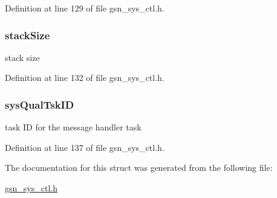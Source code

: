 Definition at line 129 of file gsn\_\-sys\_\-ctl.h.

\hypertarget{a00249_a82cabdcaee43fc729a1da5551d429f73}{
\subsubsection[{stackSize}]{ {\bf stackSize}}}
\label{a00249_a82cabdcaee43fc729a1da5551d429f73}
stack size 

Definition at line 132 of file gsn\_\-sys\_\-ctl.h.

\hypertarget{a00249_a3e06cb8fa58f49b7004a85c6f387ddc7}{
\subsubsection[{sysQualTskID}]{ {\bf sysQualTskID}}}
\label{a00249_a3e06cb8fa58f49b7004a85c6f387ddc7}
task ID for the message handler task 

Definition at line 137 of file gsn\_\-sys\_\-ctl.h.



The documentation for this struct was generated from the following file:\begin{DoxyCompactItemize}
\item 
\hyperlink{a00592}{gsn\_\-sys\_\-ctl.h}\end{DoxyCompactItemize}
